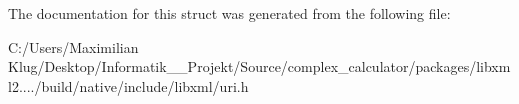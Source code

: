 The documentation for this struct was generated from the following file\+:\begin{DoxyCompactItemize}
\item 
C\+:/\+Users/\+Maximilian Klug/\+Desktop/\+Informatik\+\_\+\_\+\+Projekt/\+Source/complex\+\_\+calculator/packages/libxml2..../build/native/include/libxml/uri.\+h\end{DoxyCompactItemize}
